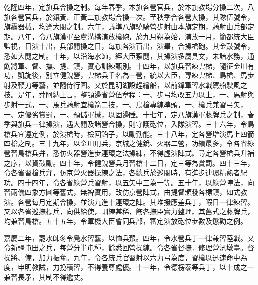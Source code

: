 \begin{pinyinscope}
乾隆四年，定旗兵合操之制。每年春季，本旗各營官兵，於本旗教場分操二次，八旗各營官兵，於鑲黃、正黃二旗教場合操一次。至秋季合各營大操，其隊伍號令，旗纛器械，均遵大閱之制。六年，議準八旗驍騎營步射由本旗定期，騎射由兵部定期。八年，令八旗漢軍至盧溝橋演放槍砲，於九月朔為始，演放一月，簡都統大臣監視，日演十出，兵部閱操之日，每旗各演百出，演畢，合操槍砲。其金鼓號令，悉如大閱之制。十年，以沿海水師，經大臣察閱，其操演多屬具文，未諳水務，通飭將軍、督、撫、提、鎮，實心訓練甄別。十四年，以旗兵習練雲梯，隨征金川有功，凱旋後，別立健銳營，雲梯兵千名為一營，統以大臣，專練雲梯、鳥槍、馬步射及鞭刀等藝，並隨侍行圍。又於昆明湖設趕繒船，以前鋒軍習水戰駕船駛風之技。是年，莽阿納上言，整頓邊省營伍章程：一、步弓均改五力以上，一、馬射與步射一式，一、馬兵騎射宜槍箭二技，一、鳥槍專練準頭，一、槍兵兼習弓矢，一、定優劣賞罰，一、預儲軍械，以固邊陲。十七年，定八旗漢軍藤牌兵之制，春季與旗兵一律操演，遇大閱及諸營合操，則守護砲位，入隊演習。三十六年，令鳥槍兵宜遵定例，於演槍時，檢回鉛子，以勵勤能。三十八年，定各營增演馬上四箭四槍之制。三十九年，以金川用兵，京城之健銳、火器二營，功績最多，令各省綠營習鳥槍兵弁，悉仿火器營進步連環之法操練，不得虛演陣式。尋定各營槍兵升補之序，以資鼓勵。四十年，令健銳營兵月習槍十二日，定三等為賞罰。四十三年，令各省習槍兵弁，仿京營火器操練之法，各總兵於巡閱時，有進步連環精熟者紀功。四十四年，令各省綠營兵習射，以五矢中三為一等。五十年，以綠營陣法，向習兩儀四象方圓等舊式，無裨實用，改仿京營陣式，由提督頒發各標鎮，如式教演。各營每月定期合操，並演九進十連環之陣。其堆撥應差兵丁，暇日一律練習。又以各省巡撫標兵，向供給使，訓練甚稀，飭各撫臣實力整理。其舊式之藤牌兵，均兼習鳥槍。五十五年，令軍機大臣會同兵部，審定演放砲位步數及懲勸之例。

嘉慶二年，罷水師冬令鳧水習藝，以恤兵艱。四年，令水營兵丁一律兼習陸戰。又令新疆屯田之兵，每營分半屯種，餘悉回營操練。令各省督撫，修理營汛墩臺。督操將、備，加力振奮。九年，令各統兵官習射以六力弓為度，習槍以迅速命中為度，申明教誡，力挽積習，不得養尊處優。十一年，令德楞泰等兵丁，以十成之一兼習長矛，其制不得逾丈。


\end{pinyinscope}
